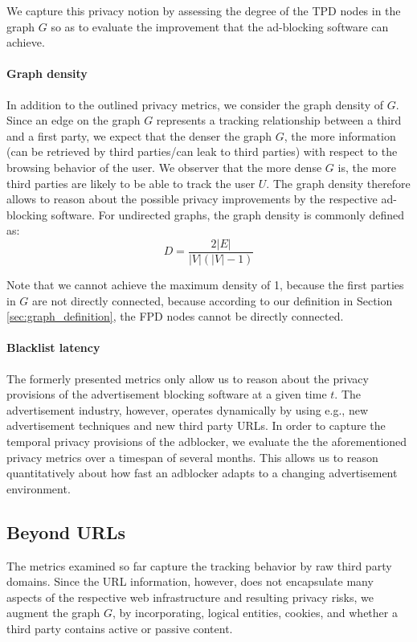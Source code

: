 \documentclass{sig-alternate}
\begin{document}
We capture this privacy notion by assessing the degree of the TPD nodes in the graph $G$ so as to evaluate the improvement that the ad-blocking software can achieve.

\paragraph{Graph density}
In addition to the outlined privacy metrics, we consider the graph density of $G$. Since an edge on the graph $G$ represents a tracking relationship between a third and a first party, we expect that the denser the graph $G$, the more information (can be retrieved by third parties/can leak to third parties) with respect to the browsing behavior of the user. We observer that the more dense $G$ is, the more third parties are likely to be able to track the user $U$. The graph density therefore allows to reason about the possible privacy improvements by the respective ad-blocking software. For undirected graphs, the graph density is commonly defined as:
\begin{equation}
D = \frac{2 |E|}{|V|(|V|-1)}
\end{equation}

Note that we cannot achieve the maximum density of 1, because the first parties in $G$ are not directly connected, because according to our definition {\color{blue}in Section \ref{sec:graph_definition}}, the FPD nodes cannot be directly connected.

\paragraph{Blacklist latency}
The formerly presented metrics only allow us to reason about the privacy provisions of the advertisement blocking software at a given time $t$. The advertisement industry, however, operates dynamically by using e.g., new advertisement techniques and new third party URLs. In order to capture the temporal privacy provisions of the adblocker, we evaluate the the aforementioned privacy metrics over a timespan of several months. This allows us to reason quantitatively about how fast an adblocker adapts to a changing advertisement environment.

\subsection{Beyond URLs}
The metrics examined so far capture the tracking behavior by raw third party domains. Since the URL information, however, does not encapsulate many aspects of the respective web infrastructure and resulting privacy risks, we augment the graph $G$, by incorporating, logical entities, cookies, and whether a third party contains active or passive content.
\end{document}
